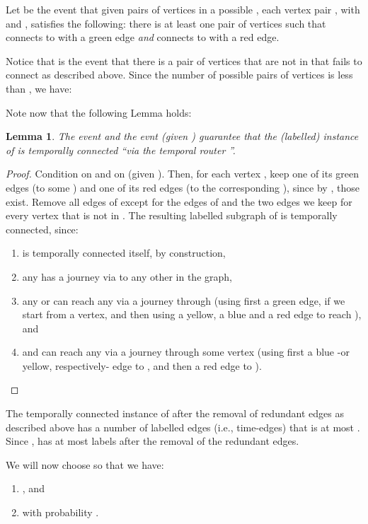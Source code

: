 \documentclass[a4paper,UKenglish]{article}
\newtheorem{lemma}{Lemma}
\begin{document}
Let  be the event that given  pairs of vertices  in a possible , each vertex pair , with  and , satisfies the following: there is at least one pair of vertices  such that  connects to  with a green edge \emph{and}  connects to  with a red edge.



Notice that  is the event that there is a pair of vertices  that are not in  that fails to connect as described above. Since the number of possible pairs of vertices  is less than , we have:


Note now that the following Lemma holds:
\begin{lemma}
The event  and the evnt  (given ) guarantee that the (labelled) instance  of  is temporally connected ``via the temporal router ''.
\end{lemma}
\begin{proof}
Condition on  and on  (given ). Then, for each vertex , keep one of its green edges (to some ) and one of its red edges (to the corresponding ), since by , those exist. Remove all edges of  except for the edges of  and the two edges we keep for every vertex that is not in . The resulting labelled subgraph of  is temporally connected, since:
\begin{enumerate}[label=\alph*)]
\item  is temporally connected itself, by construction,
\item any  has a journey via  to any other  in the graph,
\item any  or  can reach any  via a journey through (using first a green edge, if we start from a  vertex, and then using a yellow, a blue and a red edge to reach ), and
\item  and  can reach any  via a journey through some vertex  (using first a blue -or yellow, respectively- edge to , and then a red edge to ).
\end{enumerate}
\end{proof}

The temporally connected instance  of  after the removal of redundant edges as described above has a number of labelled edges (i.e., time-edges) that is at most . Since ,  has at most  labels after the removal of the redundant edges.

We will now choose  so that we have:
\begin{enumerate}[label=\alph*)]
\item , and
\item  with probability .
\end{enumerate}
\end{document}

